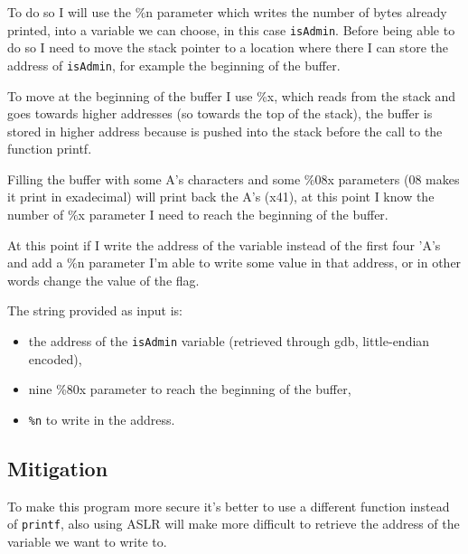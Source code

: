 \documentclass[a4paper,12pt]{article}
\begin{document}
To do so I will use the \%n parameter which writes the number of bytes already printed, into a variable we can choose, in this case \texttt{isAdmin}. Before being able to do so I need to move the stack pointer to a location where there I can store the address of \texttt{isAdmin}, for example the beginning of the buffer.

To move at the beginning of the buffer I use \%x, which reads from the stack and goes towards higher addresses (so towards the top of the stack), the buffer is stored in higher address because is pushed into the stack before the call to the function printf.

Filling the buffer with some A's characters and some \%08x parameters (08 makes it print in exadecimal) will print back the A's (x41), at this point I know the number of \%x parameter I need to reach the beginning of the buffer.

At this point if I write the address of the variable instead of the first four 'A's and add a \%n parameter I'm able to write some value in that address, or in other words change the value of the flag.

The string provided as input is:
\begin{itemize}
\item the address of the \texttt{isAdmin} variable (retrieved through gdb, little-endian encoded),
\item nine \%80x parameter to reach the beginning of the buffer,
\item \texttt{\%n} to write in the address.
\end{itemize}


\subsection{Mitigation}

To make this program more secure it's better to use a different function instead of \texttt{printf}, also using ASLR will make more difficult to retrieve the address of the variable we want to write to.
\end{document}
